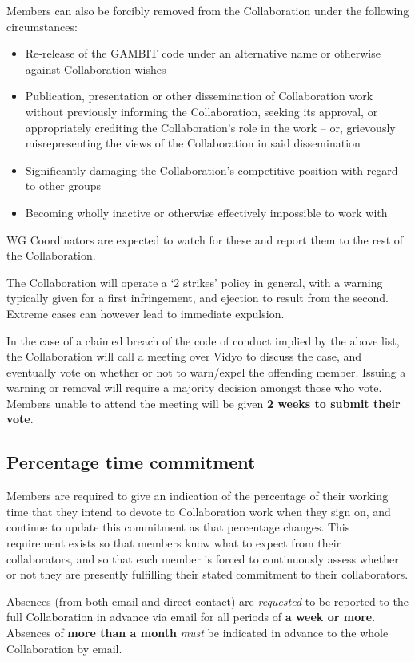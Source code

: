 Members can also be forcibly removed from the Collaboration under the following circumstances:\begin{itemize}
\item Re-release of the GAMBIT code under an alternative name or otherwise against Collaboration wishes 
\item Publication, presentation or other dissemination of Collaboration work without previously informing the Collaboration, seeking its approval, or appropriately crediting the Collaboration's role in the work -- or, grievously misrepresenting the views of the Collaboration in said dissemination
\item Significantly damaging the Collaboration's competitive position with regard to other groups 
\item Becoming wholly inactive or otherwise effectively impossible to work with
\end{itemize}
WG Coordinators are expected to watch for these and report them to the rest of the Collaboration.

The Collaboration will operate a `2 strikes' policy in general, with a warning typically given for a first infringement, and ejection to result from the second.  Extreme cases can however lead to immediate expulsion.

In the case of a claimed breach of the code of conduct implied by the above list, the Collaboration will call a meeting over Vidyo to discuss the case, and eventually vote on whether or not to warn/expel the offending member.  Issuing a warning or removal will require a majority decision amongst those who vote.  Members unable to attend the meeting will be given \textbf{2 weeks to submit their vote}.

\subsection{Percentage time commitment}

Members are required to give an indication of the percentage of their working time that they intend to devote to Collaboration work when they sign on, and continue to update this commitment as that percentage changes.  This requirement exists so that members know what to expect from their collaborators, and so that each member is forced to continuously assess whether or not they are presently fulfilling their stated commitment to their collaborators.

Absences (from both email and direct contact) are \textit{requested} to be reported to the full Collaboration in advance via email for all periods of \textbf{a week or more}.  Absences of \textbf{more than a month} \textit{must} be indicated in advance to the whole Collaboration by email.

